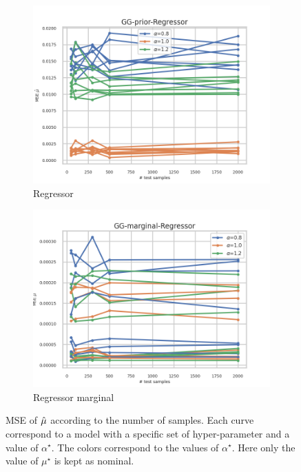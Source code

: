 \begin{figure}[ht!]
  \begin{subfigure}[t]{0.49\linewidth}
    \includegraphics[width=\linewidth]{COMPARE/GG-prior/Regressor/profusion_n_samples_mse.png}
    \caption{Regressor}
  \end{subfigure}%
  \hfill
  \begin{subfigure}[t]{0.49\linewidth}
    \includegraphics[width=\linewidth]{COMPARE/GG-marginal/Regressor/profusion_n_samples_mse.png}
    \caption{Regressor marginal}
  \end{subfigure}

  \caption{MSE of $\hat\mu$ according to the number of samples. Each curve correspond to a model with a specific set of hyper-parameter and a value of $\alpha^\star$. The colors correspond to the values of $\alpha^\star$. Here only the value of $\mu^\star$ is kept as nominal.}
  \label{fig:gg_baseline_n_samples_mse}
\end{figure}




